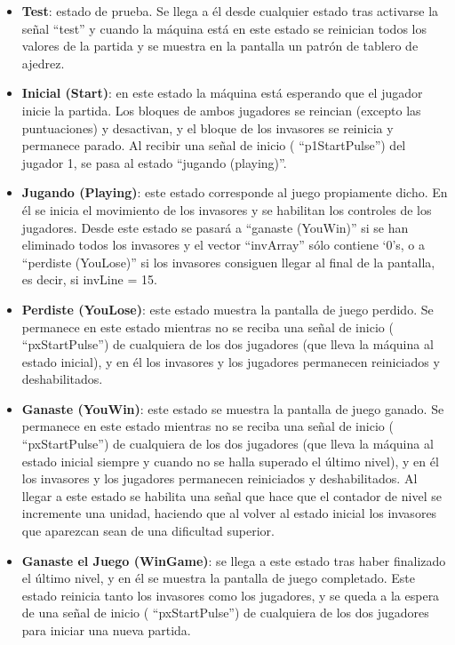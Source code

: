 \begin{itemize}
	\item {\bfseries Test}: estado de prueba. Se llega a él desde cualquier estado tras activarse la señal ``test'' y cuando la máquina está en este estado se reinician todos los valores de la partida y se muestra en la pantalla un patrón de tablero de ajedrez.
	\item {\bfseries Inicial (Start)}: en este estado la máquina está esperando que el jugador inicie la partida. Los bloques de ambos jugadores se reincian (excepto las puntuaciones) y desactivan, y el bloque de los invasores se reinicia y permanece parado. Al recibir una señal de inicio ( ``p1StartPulse'') del jugador 1, se pasa al estado ``jugando (playing)''.	
	\item {\bfseries Jugando (Playing)}: este estado corresponde al juego propiamente dicho. En él se inicia el movimiento de los invasores y se habilitan los controles de los jugadores. Desde este estado se pasará a ``ganaste (YouWin)'' si se han eliminado todos los invasores y el vector ``invArray'' sólo contiene `0's, o a ``perdiste (YouLose)'' si los invasores consiguen llegar al final de la pantalla, es decir, si invLine = 15.
	\item {\bfseries Perdiste (YouLose)}: este estado muestra la pantalla de juego perdido. Se permanece en este estado mientras no se reciba una señal de inicio ( ``pxStartPulse'') de cualquiera de los dos jugadores (que lleva la máquina al estado inicial), y en él los invasores y los jugadores permanecen reiniciados y deshabilitados.
	\item {\bfseries Ganaste (YouWin)}: este estado se muestra la pantalla de juego ganado. Se permanece en este estado mientras no se reciba una señal de inicio ( ``pxStartPulse'') de cualquiera de los dos jugadores (que lleva la máquina al estado inicial siempre y cuando no se halla superado el último nivel), y en él los invasores y los jugadores permanecen reiniciados y deshabilitados. Al llegar a este estado se habilita una señal que hace que el contador de nivel se incremente una unidad, haciendo que al volver al estado inicial los invasores que aparezcan sean de una dificultad superior.
	\item {\bfseries Ganaste el Juego (WinGame)}: se llega a este estado tras haber finalizado el último nivel, y en él se muestra la pantalla de juego completado. Este estado reinicia tanto los invasores como los jugadores, y se queda a la espera de una señal de inicio ( ``pxStartPulse'') de cualquiera de los dos jugadores para iniciar una nueva partida.
\end{itemize}

